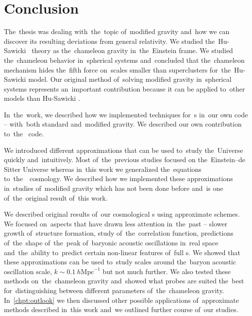 \chapter{Conclusion}
The~thesis was dealing with~the~topic of~modified gravity and~how we can discover its resulting deviations from general relativity. We studied the~Hu-Sawicki \fR\ theory as the~chameleon gravity in~the~Einstein frame. We studied the~chameleon behavior in~spherical systems and~concluded that the~chameleon mechanism hides the~fifth force on~scales smaller than superclusters for~the~Hu-Sawicki model. Our original method of~solving modified gravity in~spherical systems represents an~important contribution because it can be applied to~other models than Hu-Sawicki \fR.

In~the~work, we described how we implemented techniques for~\nbodysim s in~our own code  -- with~both standard and~modified gravity. We described our own contribution to~the~ code.

We introduced different approximations that can be used to~study the~Universe quickly and~intuitively. Most of~the~previous studies focused on the~Einstein--de Sitter Universe whereas in~this work we generalized the~equations to~the~\LCDM\ cosmology. We described how we implemented these approximations in~studies of~modified gravity which has not been done before and~is one of~the~original result of~this work.

We described original results of~our cosmological \nbodysim s using approximate schemes. We focused on~aspects that have drawn less attention in~the~past -- slower growth of~structure formation, study of~the~correlation function, predictions of~the~shape of~the~peak of~baryonic acoustic oscillations in~real space and~the~ability to~predict certain non-linear features of~full \nbodysim s. We showed that these approximations can be used to~study scales around the~baryon acoustic oscillation scale, $k\sim 0.1~h\text{Mpc}^{-1}$ but not much further. We also tested these methods on~the~chameleon gravity and~showed what probes are suited the~best for~distinguishing between different parameters of~the~chameleon gravity. In~\autoref{chpt:outlook} we then discussed other possible applications of~approximate methods described in~this work and~we outlined further course of~our studies.
%

